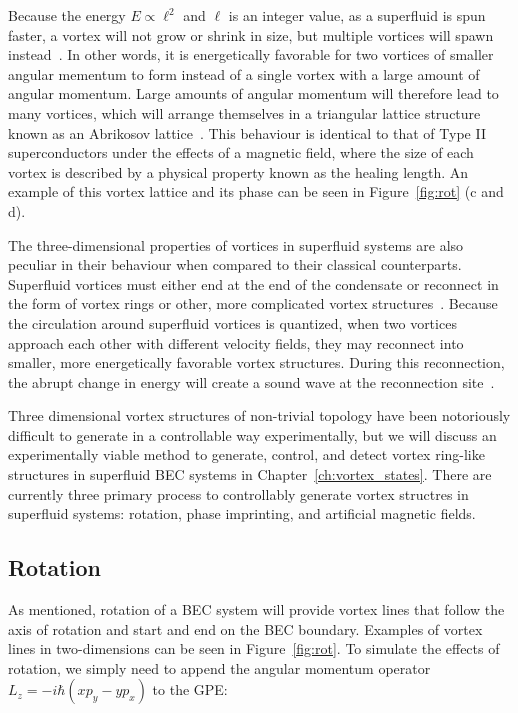 Because the energy $E \propto \ell^2$ and $\ell$ is an integer value, as a superfluid is spun faster, a vortex will not grow or shrink in size, but multiple vortices will spawn instead~\cite{Pethick2002}.
In other words, it is energetically favorable for two vortices of smaller angular mementum to form instead of a single vortex with a large amount of angular momentum.
Large amounts of angular momentum will therefore lead to many vortices, which will arrange themselves in a triangular lattice structure known as an Abrikosov lattice~\cite{Abrikosov1957, Fetter2001}.
This behaviour is identical to that of Type II superconductors under the effects of a magnetic field, where the size of each vortex is described by a physical property known as the healing length.
An example of this vortex lattice and its phase can be seen in Figure~\ref{fig:rot} (c and d).

The three-dimensional properties of vortices in superfluid systems are also peculiar in their behaviour when compared to their classical counterparts.
Superfluid vortices must either end at the end of the condensate or reconnect in the form of vortex rings or other, more complicated vortex structures~\cite{Reichl2013}.
Because the circulation around superfluid vortices is quantized, when two vortices approach each other with different velocity fields, they may reconnect into smaller, more energetically favorable vortex structures.
During this reconnection, the abrupt change in energy will create a sound wave at the reconnection site~\cite{Feynman1955}.

Three dimensional vortex structures of non-trivial topology have been notoriously difficult to generate in a controllable way experimentally, but we will discuss an experimentally viable method to generate, control, and detect vortex ring-like structures in superfluid BEC systems in Chapter~\ref{ch:vortex_states}.
There are currently three primary process to controllably generate vortex structres in superfluid systems: rotation, phase imprinting, and artificial magnetic fields.

\subsection{Rotation}

\label{sec:rot}
As mentioned, rotation of a BEC system will provide vortex lines that follow the axis of rotation and start and end on the BEC boundary.
Examples of vortex lines in two-dimensions can be seen in Figure~\ref{fig:rot}.
To simulate the effects of rotation, we simply need to append the angular momentum operator $L_z = -i\hbar(xp_y - yp_x)$ to the GPE:

